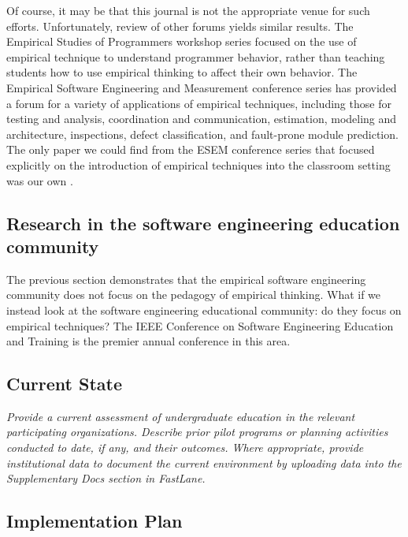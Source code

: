 Of course, it may be that this journal is not the appropriate venue for
such efforts.  Unfortunately, review of other forums yields similar
results.  The Empirical Studies of Programmers workshop series focused on
the use of empirical technique to understand programmer behavior, rather
than teaching students how to use empirical thinking to affect their own
behavior.  The Empirical Software Engineering and Measurement conference
series has provided a forum for a variety of applications of empirical
techniques, including those for testing and analysis, coordination and
communication, estimation, modeling and architecture, inspections, defect
classification, and fault-prone module prediction.  The only paper we could
find from the ESEM conference series that focused explicitly on the
introduction of empirical techniques into the classroom setting was our own
\citep{csdl2-03-12}.

\subsection*{Research in the software engineering education community}

The previous section demonstrates that the empirical software engineering community does
not focus on the pedagogy of empirical thinking.  What if we instead look at the 
software engineering educational community: do they focus on empirical techniques? 
The IEEE Conference on Software Engineering Education and Training is the premier annual
conference in this area.  












\subsection*{Current State}

{\em Provide a current assessment of undergraduate education in the relevant participating organizations.  Describe prior pilot programs or planning activities conducted to date, if any, and their outcomes.  Where appropriate, provide institutional data to document the current environment by uploading data into the Supplementary Docs section in FastLane.}

\subsection*{Implementation Plan}

